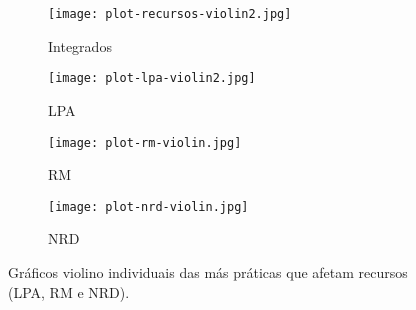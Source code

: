 \begin{figure*}
\centering
\begin{subfigure}{.23\textwidth}
  \centering
  \texttt{[image: plot-recursos-violin2.jpg]}
  \caption{Integrados}
  \label{fig:resources}
\end{subfigure}%
\begin{subfigure}{.23\textwidth}
  \centering
  \texttt{[image: plot-lpa-violin2.jpg]}
  \caption{LPA}
  \label{fig:lpa}
\end{subfigure}%
\begin{subfigure}{.23\textwidth}
  \centering
  \texttt{[image: plot-rm-violin.jpg]}
  \caption{RM}
  \label{fig:rm}
\end{subfigure}
\begin{subfigure}{.23\textwidth}
  \centering
  \texttt{[image: plot-nrd-violin.jpg]}
  \caption{NRD}
  \label{fig:nrd}
\end{subfigure}%
\caption{Gráficos violino individuais das más práticas que afetam recursos (LPA, RM e NRD).}
\label{fig:all-resources}
\end{figure*}












